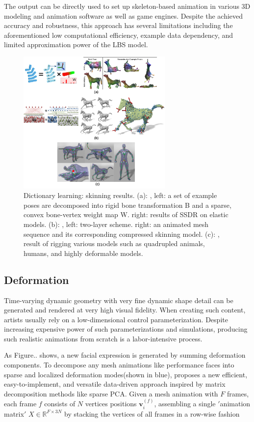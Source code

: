 The output can be directly used to set up skeleton-based animation in various 3D modeling and animation software as well as game engines. Despite the achieved accuracy and robustness, this approach has several limitations including the aforementioned low computational efficiency, example data dependency, and limited approximation power of the LBS model.


\begin{figure}[ht]
  \centering
  \includegraphics[width=3in]{images/skinning_decomposition}
  \caption{Dictionary learning: skinning results. (a): \cite{le2012smooth}, left: a set of example poses are decomposed into rigid bone transformation B and a sparse, convex bone-vertex weight map W. right: results of SSDR on elastic models. (b): \cite{le2013two}, left: two-layer scheme. right: an animated mesh sequence and its corresponding compressed skinning model. (c): \cite{le2014ras}, result of rigging various models such as quadrupled animals, humans, and highly deformable models.}
\end{figure}


\subsection{Deformation}
\label{subsec:deformation}


Time-varying dynamic geometry with very fine dynamic shape detail can be generated and rendered at very high visual fidelity.
When creating such content, artists usually rely on a low-dimensional control parameterization.
Despite increasing expensive power of such parameterizations and simulations, producing such realistic animations from scratch is a labor-intensive process.

As Figure.. shows, a new facial expression is generated by summing deformation components.
To decompose any mesh animations like performance faces into sparse and localized deformation modes(shown in blue),
\cite{neumann2013sparse} proposes a new efficient, easy-to-implement, and versatile data-driven approach inspired by matrix decomposition methods like sparse PCA\cite{zou2006sparse}.
Given a mesh animation with $F$ frames, each frame $f$ consists of $N$ vertices positions $\mathbf{v}{_{i}^{(f)}}$, assembling a single $'$animation matrix$'$ $X\in \mathbb{R}^{F\times 3N}$ by stacking the vertices of all frames in a row-wise fashion

